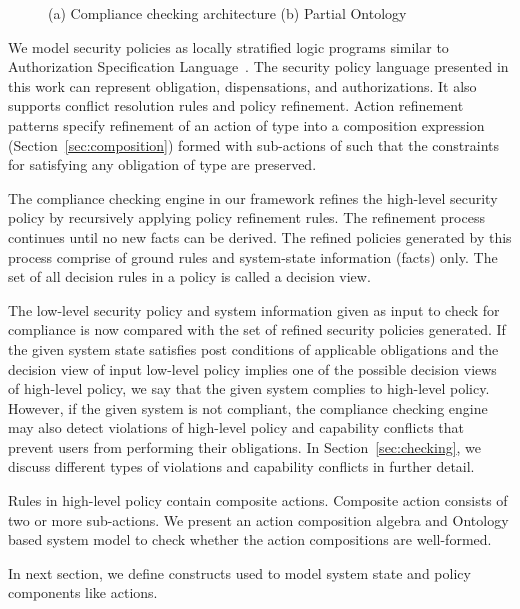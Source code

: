 \documentclass[12pt,journal,letterpaper,onecolumn]{IEEEtran}
\begin{document}
\begin{figure}[h]
\begin{center}

\end{center}
 \caption{(a) Compliance checking architecture (b) Partial Ontology}
 \label{fig:overview}
\end{figure}

We model security policies as locally stratified logic programs similar to
Authorization Specification Language~\cite{Jajodia01}. The
security policy language presented in this work can represent
obligation, dispensations, and authorizations. It also supports
conflict resolution rules and policy refinement. Action refinement
patterns specify refinement of an action of type  into a
composition expression (Section~\ref{sec:composition}) formed with
sub-actions of  such that the constraints for satisfying any
obligation of type  are preserved.


The compliance checking engine in our framework refines the high-level security policy by recursively applying policy refinement rules. The refinement process continues until no new facts can be derived. The refined policies generated by this process comprise of ground rules and system-state information (facts) only. The set of all decision rules in a policy is called a decision view.

The low-level security policy and system information given as input to check for compliance is now compared with the set of refined security policies generated. If the given system state satisfies post conditions of applicable obligations and the decision view of input low-level policy implies one of the possible decision views of high-level policy, we say that the given system complies to high-level policy. However, if the given system is not compliant, the compliance checking engine may also detect violations of high-level policy and capability conflicts that prevent users from performing their obligations. In Section~\ref{sec:checking}, we discuss different types of violations and capability conflicts in further detail.

Rules in high-level policy contain composite actions. Composite
action consists of two or more sub-actions. We present an action
composition algebra and Ontology based system model to check whether
the action compositions are well-formed.

In next section, we define constructs used to model system state and
policy components like actions.
\end{document}
